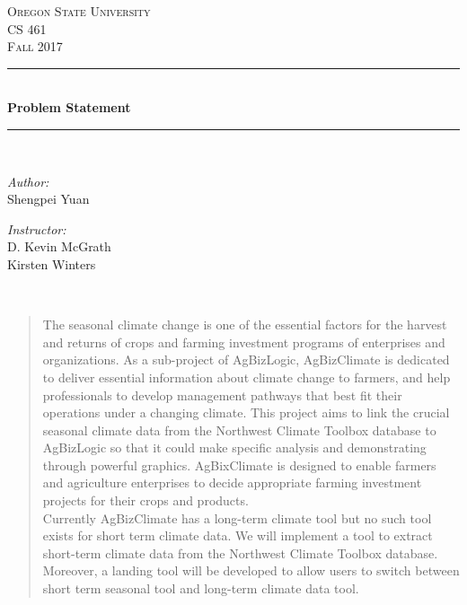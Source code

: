 \documentclass[letterpaper,10pt]{article}
\begin{document}
    \begin{titlepage}
    \newcommand{\HRule}{\rule{\linewidth}{0.5mm}}
    \center
    \textsc{\Large Oregon State University}\\[1.5cm]
    \textsc{\Large CS 461}\\[0.5cm]
    \textsc{\Large Fall 2017}\\[0.5cm]
    \HRule \\[0.4cm]
    { \huge \bfseries Problem Statement}\\[0.4cm] %
    \HRule \\[1.5cm]
    \begin{minipage}{0.4\textwidth}
        \begin{flushleft} \large
        \emph{Author:}\\
        Shengpei Yuan
        \end{flushleft}
    \end{minipage}
    \begin{minipage}{0.4\textwidth}
        \begin{flushright} \large
        \emph{Instructor:} \\
        D. Kevin McGrath\\
        Kirsten Winters
        \end{flushright}
    \end{minipage}\\[2cm]
    \begin{abstract}
    \item The seasonal climate change is one of the essential factors for the harvest and returns of crops and farming investment programs of enterprises and organizations. As a sub-project of AgBizLogic, AgBizClimate is dedicated to deliver essential information about climate change to farmers, and help professionals to develop management pathways that best fit their operations under a changing climate. This project aims to link the crucial seasonal climate data from the Northwest Climate Toolbox database to AgBizLogic so that it could make specific analysis and demonstrating through powerful graphics. AgBixClimate is designed to enable farmers and agriculture enterprises to decide appropriate farming investment projects for their crops and products.\\
    Currently AgBizClimate has a long-term climate tool but no such tool exists for short term climate data. We will implement a tool to extract short-term climate data from the Northwest Climate Toolbox database. Moreover, a landing tool will be developed to allow users to switch between short term seasonal tool and long-term climate data tool.

    \end{abstract}
    \vfill %
    \end{titlepage}
\end{document}
